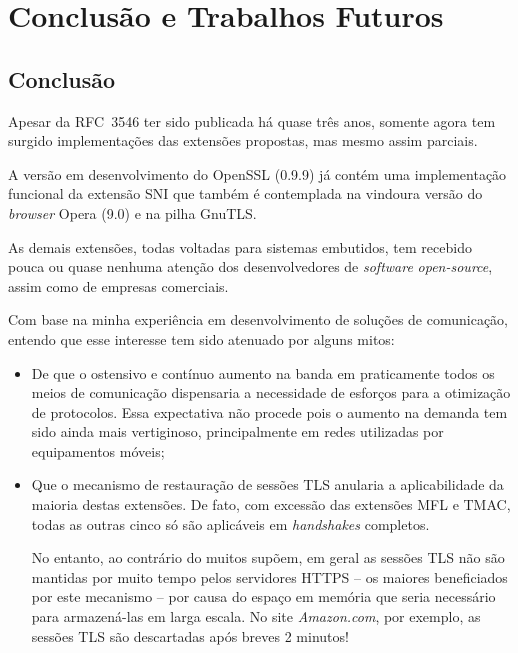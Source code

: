 
\chapter{Conclusão e Trabalhos Futuros}

\section{Conclusão}

Apesar da RFC~3546 ter sido publicada há quase três anos, somente agora
tem surgido implementações das extensões propostas, mas mesmo assim parciais.

A versão em desenvolvimento do OpenSSL (0.9.9) já contém uma implementação funcional da
extensão \acl{SNI} que também é contemplada na vindoura versão do \emph{browser} Opera (9.0)
e na pilha GnuTLS.

As demais extensões, todas voltadas para sistemas embutidos, tem recebido pouca ou quase nenhuma
atenção dos desenvolvedores de \emph{software} \emph{open-source}, assim como de empresas comerciais.

Com base na minha experiência em desenvolvimento de soluções de comunicação, entendo que esse interesse
tem sido atenuado por alguns mitos:

\begin{itemize}

\item De que o ostensivo e contínuo aumento na banda em praticamente todos os meios de comunicação dispensaria a necessidade de esforços para a otimização de protocolos. Essa expectativa não procede pois o aumento na demanda tem sido ainda mais vertiginoso, principalmente em redes utilizadas por equipamentos móveis;

\item Que o mecanismo de restauração de sessões TLS anularia a aplicabilidade da maioria destas
extensões. De fato, com excessão das extensões \acl{MFL} e \acl{TMAC}, todas as outras cinco só são
aplicáveis em \emph{handshakes} completos.

No entanto, ao contrário do muitos supõem, em geral as sessões TLS não são mantidas por muito tempo pelos servidores HTTPS -- os maiores beneficiados por este mecanismo -- por causa do espaço em memória que seria necessário para armazená-las em larga escala.
No site \emph{Amazon.com}, por exemplo, as sessões TLS são descartadas após breves 2 minutos!

\end{itemize}

